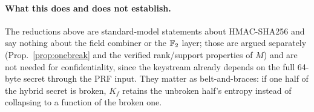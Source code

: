 \paragraph{What this does and does not establish.}
The reductions above are standard-model statements about HMAC-SHA256 and say
nothing about the field combiner or the $\mathbb{F}_2$ layer; those are argued
separately (Prop.~\ref{prop:onebreak} and the verified rank/support properties
of $M$) and are not needed for confidentiality, since the keystream already
depends on the full 64-byte secret through the PRF input. They matter as
belt-and-braces: if one half of the hybrid secret is broken, $K_f$ retains the
unbroken half's entropy instead of collapsing to a function of the broken one.
